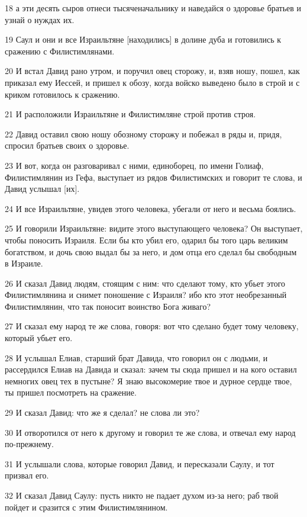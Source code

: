 \par 18 а эти десять сыров отнеси тысяченачальнику и наведайся о здоровье братьев и узнай о нуждах их.
\par 19 Саул и они и все Израильтяне [находились] в долине дуба и готовились к сражению с Филистимлянами.
\par 20 И встал Давид рано утром, и поручил овец сторожу, и, взяв ношу, пошел, как приказал ему Иессей, и пришел к обозу, когда войско выведено было в строй и с криком готовилось к сражению.
\par 21 И расположили Израильтяне и Филистимляне строй против строя.
\par 22 Давид оставил свою ношу обозному сторожу и побежал в ряды и, придя, спросил братьев своих о здоровье.
\par 23 И вот, когда он разговаривал с ними, единоборец, по имени Голиаф, Филистимлянин из Гефа, выступает из рядов Филистимских и говорит те слова, и Давид услышал [их].
\par 24 И все Израильтяне, увидев этого человека, убегали от него и весьма боялись.
\par 25 И говорили Израильтяне: видите этого выступающего человека? Он выступает, чтобы поносить Израиля. Если бы кто убил его, одарил бы того царь великим богатством, и дочь свою выдал бы за него, и дом отца его сделал бы свободным в Израиле.
\par 26 И сказал Давид людям, стоящим с ним: что сделают тому, кто убьет этого Филистимлянина и снимет поношение с Израиля? ибо кто этот необрезанный Филистимлянин, что так поносит воинство Бога живаго?
\par 27 И сказал ему народ те же слова, говоря: вот что сделано будет тому человеку, который убьет его.
\par 28 И услышал Елиав, старший брат Давида, что говорил он с людьми, и рассердился Елиав на Давида и сказал: зачем ты сюда пришел и на кого оставил немногих овец тех в пустыне? Я знаю высокомерие твое и дурное сердце твое, ты пришел посмотреть на сражение.
\par 29 И сказал Давид: что же я сделал? не слова ли это?
\par 30 И отворотился от него к другому и говорил те же слова, и отвечал ему народ по-прежнему.
\par 31 И услышали слова, которые говорил Давид, и пересказали Саулу, и тот призвал его.
\par 32 И сказал Давид Саулу: пусть никто не падает духом из-за него; раб твой пойдет и сразится с этим Филистимлянином.
